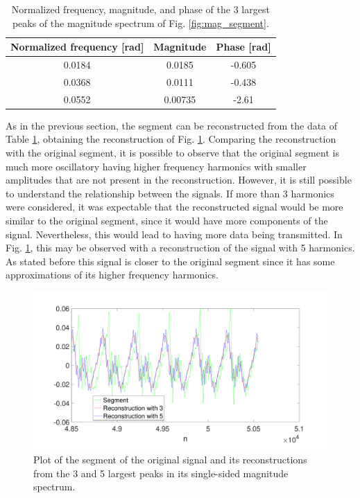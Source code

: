 \documentclass[a4paper, oneside, 11pt]{article}
\begin{document}
\begin{table}[ht]
    \centering
    \caption{Normalized frequency, magnitude, and phase of the 3 largest peaks of the magnitude spectrum of Fig. \ref{fig:mag_segment}.}
    \begin{tabular}{ccc}
        \hline
        Normalized frequency [rad] & Magnitude & Phase [rad] \\
        \hline
        0.0184 & 0.0185 & -0.605 \\
        0.0368 & 0.0111 & -0.438 \\
        0.0552 & 0.00735 & -2.61 \\
        \hline
    \end{tabular}
    \label{tab:peaks_segment}
\end{table}

As in the previous section, the segment can be reconstructed from the data of Table \ref{tab:peaks_segment}, obtaining the reconstruction of Fig. \ref{fig:segment_reconstruction}. Comparing the reconstruction with the original segment, it is possible to observe that the original segment is much more oscillatory having higher frequency harmonics with smaller amplitudes that are not present in the reconstruction. However, it is still possible to understand the relationship between the signals. If more than 3 harmonics were considered, it was expectable that the reconstructed signal would be more similar to the original segment, since it would have more components of the signal. Nevertheless, this would lead to having more data being transmitted. In Fig. \ref{fig:segment_reconstruction}, this may be observed with a reconstruction of the signal with 5 harmonics. As stated before this signal is closer to the original segment since it has some approximations of its higher frequency harmonics.

\begin{figure}[ht]
    \centering
    \includegraphics[width=\textwidth]{figures/segment_reconstruction.pdf}
    \caption{Plot of the segment of the original signal and its reconstructions from the 3 and 5 largest peaks in its single-sided magnitude spectrum.}
    \label{fig:segment_reconstruction}
\end{figure}
\end{document}
